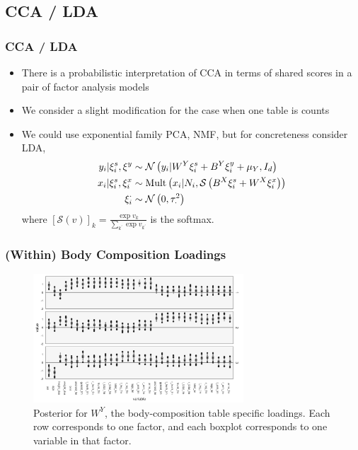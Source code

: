 \documentclass{beamer}
\begin{document}
\subsection{CCA / LDA}
\label{subsec:cca_lda}

\begin{frame}
  \frametitle{CCA / LDA}
  \begin{itemize}
  \item There is a probabilistic interpretation of CCA in terms of shared scores
    in a pair of factor analysis models \citep{bach2005probabilistic}
  \item We consider a slight modification for the case when one table is counts
  \item We could use exponential family PCA, NMF, but for concreteness consider LDA,
    \begin{align*}
      y_{i} \vert \xi_{i}^{s}, \xi^{y} &\sim \mathcal{N}\left(y_{i} \vert W^{Y}\xi_{i}^{s} +
      B^{Y}\xi_{i}^{y} + \mu_{Y}, I_{d}\right) \\
      x_{i} \vert \xi_{i}^{s}, \xi_{i}^{x} &\sim \textnormal{Mult}\left(x_{i} \vert N_{i},
      \mathcal{S}\left(B^{X} \xi_{i}^{s} + W^{X} \xi_{i}^{x}\right)\right) \\
      \xi_{i}^{\cdot} &\sim \mathcal{N}\left(0, \tau_{\cdot}^{2}\right)
    \end{align*}
    where $\left[\mathcal{S}\left(v\right)\right]_{k} =
    \frac{\exp{v_{k}}}{\sum_{k^{\prime}}\exp{v_{k^{\prime}}}}$ is the softmax.
  \end{itemize}
\end{frame}

\begin{frame}
  \frametitle{(Within) Body Composition Loadings}
\begin{figure}[ht]
  \centering
  \includegraphics[width=0.7\textwidth]{figure/within_loadings_body_comp_boxplots}
  \caption{Posterior for $W^{Y}$, the body-composition table specific loadings.
    Each row corresponds to one factor, and each boxplot corresponds to one
    variable in that factor.\label{fig:within_loadings_body_comp_boxplots} }
\end{figure}
\end{frame}
\end{document}
